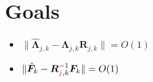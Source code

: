 \documentclass{article}
\numberwithin{equation}{section}
\begin{document}






\section{Goals}
\begin{itemize}
	\item $\lVert \hat{\bm{\Lambda}}_{j,k} - \bm{\Lambda}_{j,k}\bm{R}_{j,k} \rVert = O(1)$
	\item $\lVert \hat{\bm{F}}_{k} - \bm{R}^{-1}_{\textcolor{red}{j},k}\bm{F}_{k} \rVert = O(1)$
\end{itemize}
\end{document}
